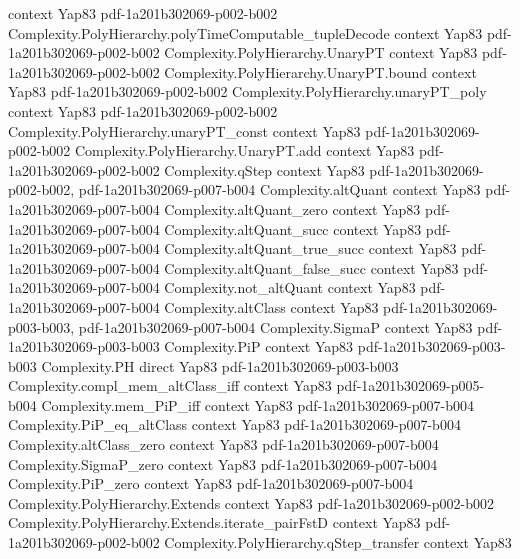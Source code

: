 \begin{theorem}
  {context}
  {Yap83}
  {pdf-1a201b302069-p002-b002}
\proofstep
  {Complexity.PolyHierarchy.polyTimeComputable_tupleDecode}
  {context}
  {Yap83}
  {pdf-1a201b302069-p002-b002}
\proofstep
  {Complexity.PolyHierarchy.UnaryPT}
  {context}
  {Yap83}
  {pdf-1a201b302069-p002-b002}
\proofstep
  {Complexity.PolyHierarchy.UnaryPT.bound}
  {context}
  {Yap83}
  {pdf-1a201b302069-p002-b002}
\proofstep
  {Complexity.PolyHierarchy.unaryPT_poly}
  {context}
  {Yap83}
  {pdf-1a201b302069-p002-b002}
\proofstep
  {Complexity.PolyHierarchy.unaryPT_const}
  {context}
  {Yap83}
  {pdf-1a201b302069-p002-b002}
\proofstep
  {Complexity.PolyHierarchy.UnaryPT.add}
  {context}
  {Yap83}
  {pdf-1a201b302069-p002-b002}
\proofstep
  {Complexity.qStep}
  {context}
  {Yap83}
  {pdf-1a201b302069-p002-b002,
    pdf-1a201b302069-p007-b004}
\proofstep
  {Complexity.altQuant}
  {context}
  {Yap83}
  {pdf-1a201b302069-p007-b004}
\proofstep
  {Complexity.altQuant_zero}
  {context}
  {Yap83}
  {pdf-1a201b302069-p007-b004}
\proofstep
  {Complexity.altQuant_succ}
  {context}
  {Yap83}
  {pdf-1a201b302069-p007-b004}
\proofstep
  {Complexity.altQuant_true_succ}
  {context}
  {Yap83}
  {pdf-1a201b302069-p007-b004}
\proofstep
  {Complexity.altQuant_false_succ}
  {context}
  {Yap83}
  {pdf-1a201b302069-p007-b004}
\proofstep
  {Complexity.not_altQuant}
  {context}
  {Yap83}
  {pdf-1a201b302069-p007-b004}
\proofstep
  {Complexity.altClass}
  {context}
  {Yap83}
  {pdf-1a201b302069-p003-b003,
    pdf-1a201b302069-p007-b004}
\proofstep
  {Complexity.SigmaP}
  {context}
  {Yap83}
  {pdf-1a201b302069-p003-b003}
\proofstep
  {Complexity.PiP}
  {context}
  {Yap83}
  {pdf-1a201b302069-p003-b003}
\proofstep
  {Complexity.PH}
  {direct}
  {Yap83}
  {pdf-1a201b302069-p003-b003}
\proofstep
  {Complexity.compl_mem_altClass_iff}
  {context}
  {Yap83}
  {pdf-1a201b302069-p005-b004}
\proofstep
  {Complexity.mem_PiP_iff}
  {context}
  {Yap83}
  {pdf-1a201b302069-p007-b004}
\proofstep
  {Complexity.PiP_eq_altClass}
  {context}
  {Yap83}
  {pdf-1a201b302069-p007-b004}
\proofstep
  {Complexity.altClass_zero}
  {context}
  {Yap83}
  {pdf-1a201b302069-p007-b004}
\proofstep
  {Complexity.SigmaP_zero}
  {context}
  {Yap83}
  {pdf-1a201b302069-p007-b004}
\proofstep
  {Complexity.PiP_zero}
  {context}
  {Yap83}
  {pdf-1a201b302069-p007-b004}
\proofstep
  {Complexity.PolyHierarchy.Extends}
  {context}
  {Yap83}
  {pdf-1a201b302069-p002-b002}
\proofstep
  {Complexity.PolyHierarchy.Extends.iterate_pairFstD}
  {context}
  {Yap83}
  {pdf-1a201b302069-p002-b002}
\proofstep
  {Complexity.PolyHierarchy.qStep_transfer}
  {context}
  {Yap83}

\end{theorem}
